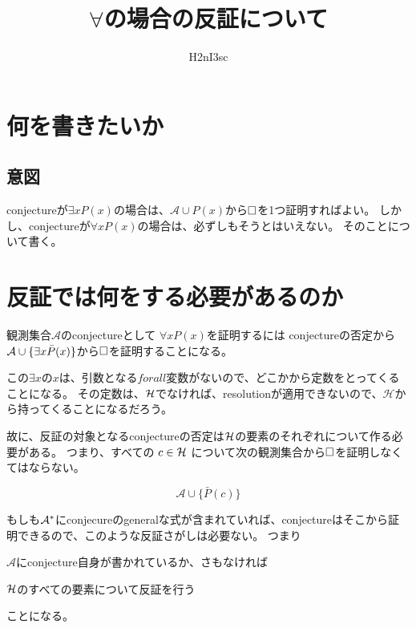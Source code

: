 \documentclass[10pt, oneside]{jarticle}   	%
\title{$\forall$の場合の反証について}
\author{H2nI3sc}
\begin{document}
\maketitle

\section{何を書きたいか}
\subsection{意図}
conjectureが$\exists x P(x)$の場合は、$\mathcal{A} \cup P(x)$から$\Box$を1つ証明すればよい。
しかし、conjectureが$\forall x P(x)$の場合は、必ずしもそうとはいえない。
そのことについて書く。



\newpage

\section{反証では何をする必要があるのか}
観測集合$\mathcal{A}$のconjectureとして $\forall x P(x)$を証明するには
conjectureの否定から $\mathcal{A} \cup \{{\exists x \bar{P}(x)}\}$から$\Box$を証明することになる。

この$\exists x$の$x$は、引数となる$forall $変数がないので、どこかから定数をとってくることになる。
その定数は、$\mathcal{H}$でなければ、resolutionが適用できないので、$\mathcal{H}$から持ってくることになるだろう。

故に、反証の対象となるconjectureの否定は$\mathcal{H}$の要素のそれぞれについて作る必要がある。
つまり、すべての $ c \in \mathcal{H}$ について次の観測集合から$\Box$を証明しなくてはならない。

\begin{equation}
 \mathcal{A} \cup \{ \bar{P}(c) \} 
\end{equation}

もしも$\mathcal{A}^{*}$にconjecureのgeneralな式が含まれていれば、conjectureはそこから証明できるので、このような反証さがしは必要ない。
つまり

\begin{description}
\item $\mathcal{A}$にconjecture自身が書かれているか、さもなければ
\item $\mathcal{H}$のすべての要素について反証を行う
\end{description}

ことになる。
\end{document}
